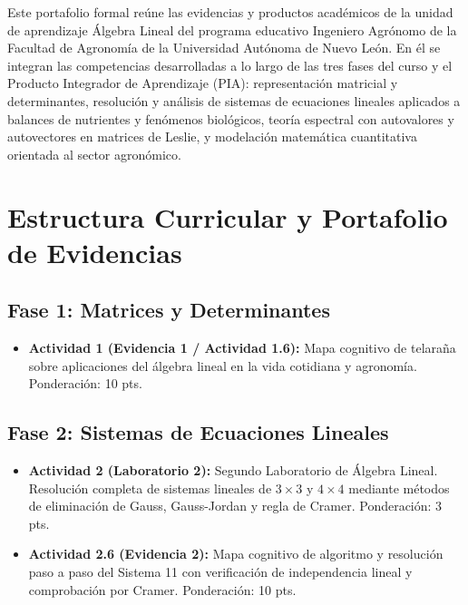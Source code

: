 \documentclass[spanish,letterpaper,oneside]{article}
\begin{document}
\templatePortrait
\templatePagecfg
\onehalfspacing

\begin{abstractd}
Este portafolio formal re\'{u}ne las evidencias y productos acad\'{e}micos de la unidad de aprendizaje \'{A}lgebra Lineal del programa educativo Ingeniero Agr\'{o}nomo de la Facultad de Agronom\'{i}a de la Universidad Aut\'{o}noma de Nuevo Le\'{o}n. En \'{e}l se integran las competencias desarrolladas a lo largo de las tres fases del curso y el Producto Integrador de Aprendizaje (PIA): representaci\'{o}n matricial y determinantes, resoluci\'{o}n y an\'{a}lisis de sistemas de ecuaciones lineales aplicados a balances de nutrientes y fen\'{o}menos biol\'{o}gicos, teor\'{i}a espectral con autovalores y autovectores en matrices de Leslie, y modelaci\'{o}n matem\'{a}tica cuantitativa orientada al sector agron\'{o}mico.
\end{abstractd}

\templateIndex
\templateFinalcfg

\section{Estructura Curricular y Portafolio de Evidencias}

\subsection{Fase 1: Matrices y Determinantes}
\begin{itemize}
  \item \textbf{Actividad 1 (Evidencia 1 / Actividad 1.6):} Mapa cognitivo de telara\~{n}a sobre aplicaciones del \'{a}lgebra lineal en la vida cotidiana y agronom\'{i}a. Ponderaci\'{o}n: 10 pts.
\end{itemize}

\subsection{Fase 2: Sistemas de Ecuaciones Lineales}
\begin{itemize}
  \item \textbf{Actividad 2 (Laboratorio 2):} Segundo Laboratorio de \'Algebra Lineal. Resoluci\'on completa de sistemas lineales de $3\times 3$ y $4\times 4$ mediante m\'etodos de eliminaci\'on de Gauss, Gauss-Jordan y regla de Cramer. Ponderaci\'on: 3 pts.
  \item \textbf{Actividad 2.6 (Evidencia 2):} Mapa cognitivo de algoritmo y resoluci\'{o}n paso a paso del Sistema 11 con verificaci\'{o}n de independencia lineal y comprobaci\'{o}n por Cramer. Ponderaci\'{o}n: 10 pts.
\end{itemize}
\end{document}
